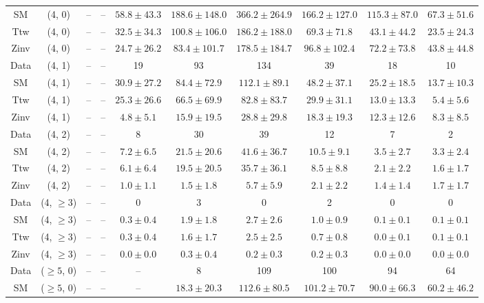 \begin{table}[h!]
{\begin{tabular}{cccccccccc}
	SM & (4, 0) & -- & -- & $58.8\pm 43.3$ & $188.6\pm 148.0$ & $366.2\pm 264.9$ & $166.2\pm 127.0$ & $115.3\pm 87.0$ & $67.3\pm 51.6$ \\[0.5ex] 
	Ttw & (4, 0) & -- & -- & $32.5\pm 34.3$ & $100.8\pm 106.0$ & $186.2\pm 188.0$ & $69.3\pm 71.8$ & $43.1\pm 44.2$ & $23.5\pm 24.3$ \\[0.5ex] 
	Zinv & (4, 0) & -- & -- & $24.7\pm 26.2$ & $83.4\pm 101.7$ & $178.5\pm 184.7$ & $96.8\pm 102.4$ & $72.2\pm 73.8$ & $43.8\pm 44.8$ \\[0.5ex] 
	Data & (4, 1) & -- & -- & 19 & 93 & 134 & 39 & 18 & 10 \\[0.5ex] 
	SM & (4, 1) & -- & -- & $30.9\pm 27.2$ & $84.4\pm 72.9$ & $112.1\pm 89.1$ & $48.2\pm 37.1$ & $25.2\pm 18.5$ & $13.7\pm 10.3$ \\[0.5ex] 
	Ttw & (4, 1) & -- & -- & $25.3\pm 26.6$ & $66.5\pm 69.9$ & $82.8\pm 83.7$ & $29.9\pm 31.1$ & $13.0\pm 13.3$ & $5.4\pm 5.6$ \\[0.5ex] 
	Zinv & (4, 1) & -- & -- & $4.8\pm 5.1$ & $15.9\pm 19.5$ & $28.8\pm 29.8$ & $18.3\pm 19.3$ & $12.3\pm 12.6$ & $8.3\pm 8.5$ \\[0.5ex] 
	Data & (4, 2) & -- & -- & 8 & 30 & 39 & 12 & 7 & 2 \\[0.5ex] 
	SM & (4, 2) & -- & -- & $7.2\pm 6.5$ & $21.5\pm 20.6$ & $41.6\pm 36.7$ & $10.5\pm 9.1$ & $3.5\pm 2.7$ & $3.3\pm 2.4$ \\[0.5ex] 
	Ttw & (4, 2) & -- & -- & $6.1\pm 6.4$ & $19.5\pm 20.5$ & $35.7\pm 36.1$ & $8.5\pm 8.8$ & $2.1\pm 2.2$ & $1.6\pm 1.7$ \\[0.5ex] 
	Zinv & (4, 2) & -- & -- & $1.0\pm 1.1$ & $1.5\pm 1.8$ & $5.7\pm 5.9$ & $2.1\pm 2.2$ & $1.4\pm 1.4$ & $1.7\pm 1.7$ \\[0.5ex] 
	Data & (4, $\ge3$) & -- & -- & 0 & 3 & 0 & 2 & 0 & 0 \\[0.5ex] 
	SM & (4, $\ge3$) & -- & -- & $0.3\pm 0.4$ & $1.9\pm 1.8$ & $2.7\pm 2.6$ & $1.0\pm 0.9$ & $0.1\pm 0.1$ & $0.1\pm 0.1$ \\[0.5ex] 
	Ttw & (4, $\ge3$) & -- & -- & $0.3\pm 0.4$ & $1.6\pm 1.7$ & $2.5\pm 2.5$ & $0.7\pm 0.8$ & $0.0\pm 0.1$ & $0.1\pm 0.1$ \\[0.5ex] 
	Zinv & (4, $\ge3$) & -- & -- & $0.0\pm 0.0$ & $0.3\pm 0.4$ & $0.2\pm 0.3$ & $0.2\pm 0.3$ & $0.0\pm 0.0$ & $0.0\pm 0.0$ \\[0.5ex] 
	Data & ($\ge5$, 0) & -- & -- & -- & 8 & 109 & 100 & 94 & 64 \\[0.5ex] 
	SM & ($\ge5$, 0) & -- & -- & -- & $18.3\pm 20.3$ & $112.6\pm 80.5$ & $101.2\pm 70.7$ & $90.0\pm 66.3$ & $60.2\pm 46.2$ \\[0.5ex] 

\end{tabular}}
\end{table}
